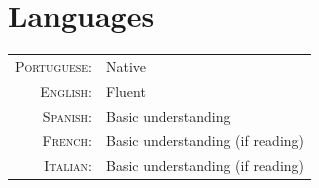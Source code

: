 \documentclass[letter,10pt]{article} %
\begin{document}
\section{Languages}

\begin{tabular}{rl}
	\textsc{Portuguese:} & Native\\

	\textsc{English:} & Fluent\\

	\textsc{Spanish:} & Basic understanding\\

	\textsc{French:} & Basic understanding (if reading)\\

	\textsc{Italian:} & Basic understanding (if reading)\\
\end{tabular} \\

\end{document}
